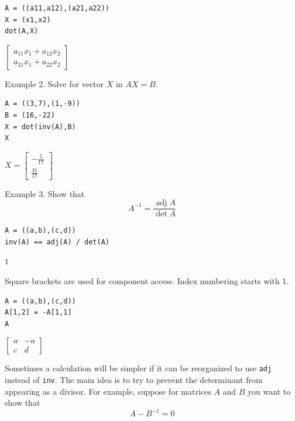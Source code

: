 \documentclass[12pt]{article}
\begin{document}
{\color{blue}
\begin{verbatim}
A = ((a11,a12),(a21,a22))
X = (x1,x2)
dot(A,X)
\end{verbatim}
}

$\displaystyle
\begin{bmatrix}
a_{11}x_1+a_{12}x_2
\\[1ex]
a_{21}x_1+a_{22}x_2
\end{bmatrix}
$

\bigskip

Example 2. Solve for vector $X$ in $AX=B$.

{\color{blue}
\begin{verbatim}
A = ((3,7),(1,-9))
B = (16,-22)
X = dot(inv(A),B)
X
\end{verbatim}
}

$\displaystyle
X=
\begin{bmatrix}
-\frac{5}{17}
\\[1ex]
\frac{41}{17}
\end{bmatrix}
$

\bigskip

Example 3. Show that
\begin{equation*}
A^{-1}=\frac{\operatorname{adj}A}{\operatorname{det}A}
\end{equation*}

{\color{blue}
\begin{verbatim}
A = ((a,b),(c,d))
inv(A) == adj(A) / det(A)
\end{verbatim}
}

$1$

\iffalse

\bigskip

Square brackets are used for component access.
Index numbering starts with 1.

{\color{blue}
\begin{verbatim}
A = ((a,b),(c,d))
A[1,2] = -A[1,1]
A
\end{verbatim}
}

$\displaystyle
\begin{bmatrix}
a & -a
\\[1ex]
c & d
\end{bmatrix}
$

\bigskip

Sometimes a calculation will be simpler if it can be reorganized to use
\verb$adj$ instead of \verb$inv$.
The main idea is to try to prevent the determinant from appearing as a
divisor.
For example, suppose for matrices $A$ and $B$ you want to show that
\begin{equation*}
{A}-{B}^{-1}=0
\end{equation*}
\end{document}
